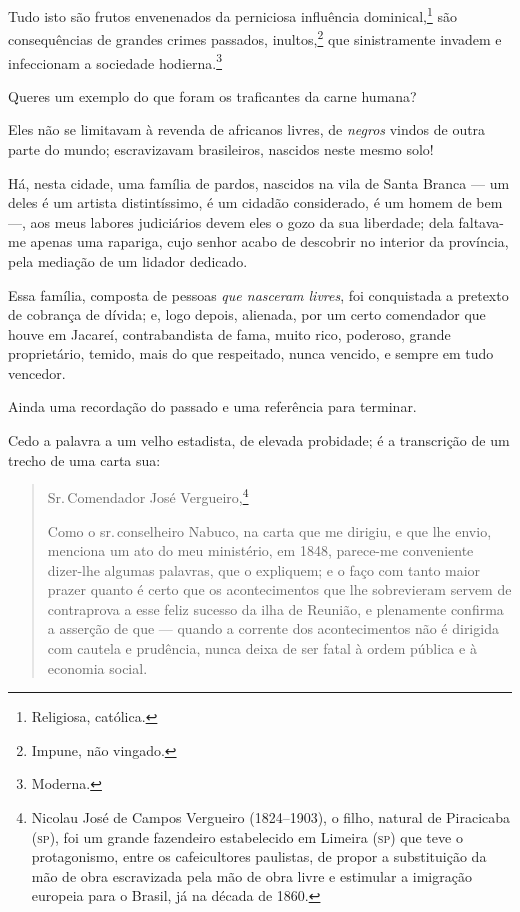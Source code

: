 {Tudo isto são frutos envenenados da perniciosa influência
dominical,\footnote{Religiosa, católica.} são consequências de grandes
crimes passados, inultos,\footnote{Impune, não vingado.} que
sinistramente invadem e infeccionam a sociedade hodierna.\footnote{
  Moderna.}

Queres um exemplo do que foram os traficantes da carne humana?

Eles não se limitavam à revenda de africanos livres, de \emph{negros}
vindos de outra parte do mundo; escravizavam brasileiros, nascidos neste
mesmo solo!

Há, nesta cidade, uma família de pardos, nascidos na vila de Santa
Branca --- um deles é um artista distintíssimo, é um cidadão
considerado, é um homem de bem ---, aos meus labores judiciários devem
eles o gozo da sua liberdade; dela faltava-me apenas uma rapariga, cujo
senhor acabo de descobrir no interior da província, pela mediação de um
lidador dedicado.

Essa família, composta de pessoas \textit{que nasceram livres}, foi conquistada a
pretexto de cobrança de dívida; e, logo depois, alienada, por um certo
comendador que houve em Jacareí, contrabandista de fama, muito rico,
poderoso, grande proprietário, temido, mais do que respeitado, nunca
vencido, e sempre em tudo vencedor.

Ainda uma recordação do passado e uma referência para terminar.

Cedo a palavra a um velho estadista, de elevada probidade; é a
transcrição de um trecho de uma carta sua:

\begin{quote}\label{vergueiro}
\noindent{}Sr.\,Comendador José Vergueiro,\footnote{Nicolau José de Campos 
  Vergueiro (1824--1903), o filho, natural de Piracicaba (\textsc{sp}), foi um
  grande fazendeiro estabelecido em Limeira (\textsc{sp}) que teve o
  protagonismo, entre os cafeicultores paulistas, de propor a
  substituição da mão de obra escravizada pela mão de obra livre e
  estimular a imigração europeia para o Brasil, já na década de 1860.}

Como o sr.\,conselheiro Nabuco, na carta que me dirigiu, e que lhe envio,
menciona um ato do meu ministério, em 1848, parece-me conveniente
dizer-lhe algumas palavras, que o expliquem; e o faço com tanto maior
prazer quanto é certo que os acontecimentos que lhe sobrevieram servem
de contraprova a esse feliz sucesso da ilha de Reunião, e plenamente
confirma a asserção de que --- quando a corrente dos acontecimentos não
é dirigida com cautela e prudência, nunca deixa de ser fatal à ordem
pública e à economia social.


\end{quote}}
